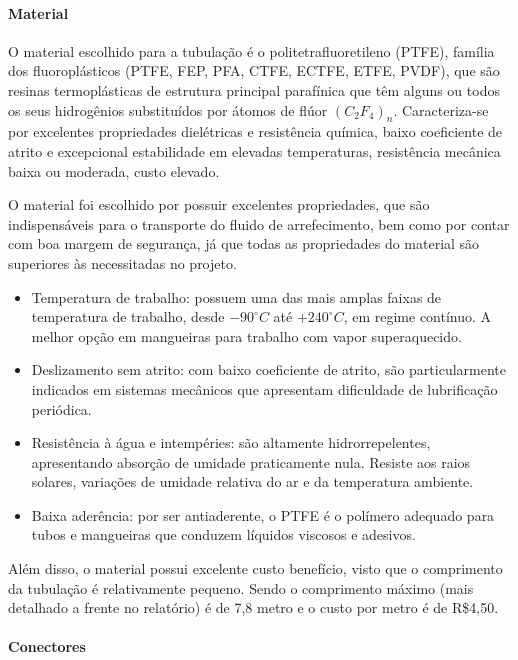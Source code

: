 \paragraph{Material}

O material escolhido para a tubulação é o politetrafluoretileno (PTFE), família dos fluoroplásticos (PTFE, FEP, PFA, CTFE, ECTFE, ETFE, PVDF), que são resinas termoplásticas de estrutura principal parafínica que têm alguns ou todos os seus hidrogênios substituídos por átomos de flúor $(C_{2}F_{4})_{n}$. Caracteriza-se por excelentes propriedades dielétricas e resistência química, baixo coeficiente de atrito e excepcional estabilidade em elevadas temperaturas, resistência mecânica baixa ou moderada, custo elevado.

O material foi escolhido por possuir excelentes propriedades, que são indispensáveis para o transporte do fluido de arrefecimento, bem como por contar com boa margem de segurança, já que todas as propriedades do material são superiores às necessitadas no projeto.

\begin{itemize}
\item 	Temperatura de trabalho: possuem uma das mais amplas faixas de temperatura de trabalho, desde $-90^{\circ}C$ até $+240^{\circ}C$, em regime contínuo. A melhor opção em mangueiras para trabalho com vapor superaquecido.
\item Deslizamento sem atrito: com baixo coeficiente de atrito, são particularmente indicados em sistemas mecânicos que apresentam dificuldade de lubrificação periódica.
\item Resistência à água e intempéries: são altamente hidrorrepelentes, apresentando absorção de umidade praticamente nula. Resiste aos raios solares, variações de umidade relativa do ar e da temperatura ambiente. 
\item Baixa aderência: por ser antiaderente, o PTFE é o polímero adequado para tubos e mangueiras que conduzem líquidos viscosos e adesivos. 
\end{itemize}

Além disso, o material possui excelente custo benefício, visto que o comprimento da tubulação é relativamente pequeno. Sendo o comprimento máximo (mais detalhado a frente no relatório) é de 7,8 metro e o custo por metro é de R\$4,50.

\paragraph{Conectores}

